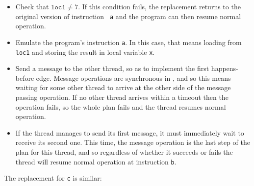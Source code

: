 \begin{itemize}
\item Check that $\mathtt{loc1} \not= 7$.  If this condition fails,
  the replacement returns to the original version of instruction {\tt
    a} and the program can then resume normal operation.
\item Emulate the program's instruction {\tt a}.  In this case, that
  means loading from {\tt loc1} and storing the result in local
  variable {\tt x}.
\item Send a message to the other thread, so as to implement the first
  happens-before edge.  Message operations are synchronous in
  {\implementation}, and so this means waiting for some other thread
  to arrive at the other side of the message passing operation.  If no
  other thread arrives within a timeout then the operation fails, so
  the whole plan fails and the thread resumes normal operation.
\item If the thread manages to send its first message, it must
  immediately wait to receive its second one.  This time, the message
  operation is the last step of the plan for this thread, and so
  regardless of whether it succeeds or fails the thread will resume
  normal operation at instruction {\tt b}.
\end{itemize}

The replacement for {\tt c} is similar:

